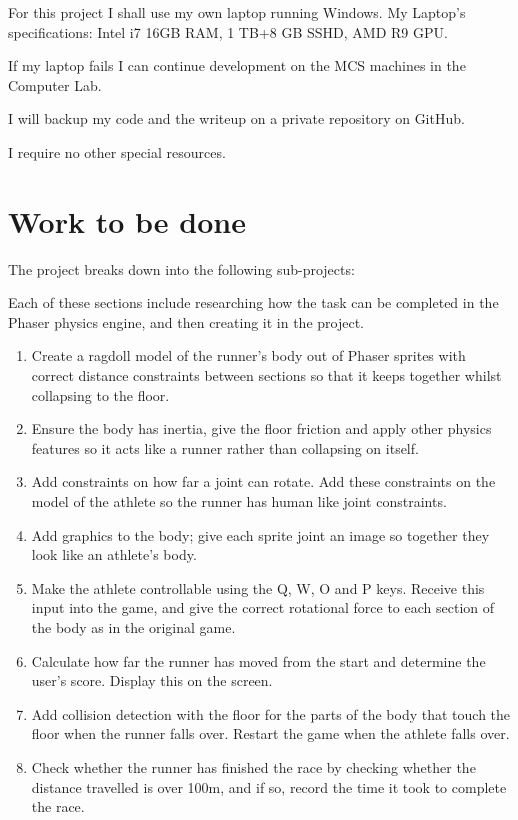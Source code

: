 \documentclass[12pt,a4paper,twoside]{article}
\begin{document}

For this project I shall use my own laptop running Windows.
My Laptop's specifications:
Intel i7 16GB RAM, 1 TB+8 GB SSHD, AMD R9 GPU.

If my laptop fails I can continue development on the MCS machines in the Computer Lab.

I will backup my code and the writeup on a private repository on GitHub.

I require no other special resources.

\section*{Work to be done}


The project breaks down into the following sub-projects:

Each of these sections include researching how the task can be completed in the Phaser physics engine, and then creating it in the project.

\begin{enumerate}
\item Create a ragdoll model of the runner's body out of Phaser sprites with correct distance constraints between sections so that it keeps together whilst collapsing to the floor.
\item Ensure the body has inertia, give the floor friction and apply other physics features so it acts like a runner rather than collapsing on itself.
\item Add constraints on how far a joint can rotate. Add these constraints on the model of the athlete so the runner has human like joint constraints.
\item Add graphics to the body; give each sprite joint an image so together they look like an athlete's body.
\item Make the athlete controllable using the Q, W, O and P keys. Receive this input into the game, and give the correct rotational force to each section of the body as in the original game.
\item Calculate how far the runner has moved from the start and determine the user's score. Display this on the screen.
\item Add collision detection with the floor for the parts of the body that touch the floor when the runner falls over. Restart the game when the athlete falls over.
\item Check whether the runner has finished the race by checking whether the distance travelled is over 100m, and if so, record the time it took to complete the race.
\end{enumerate}
\end{document}
